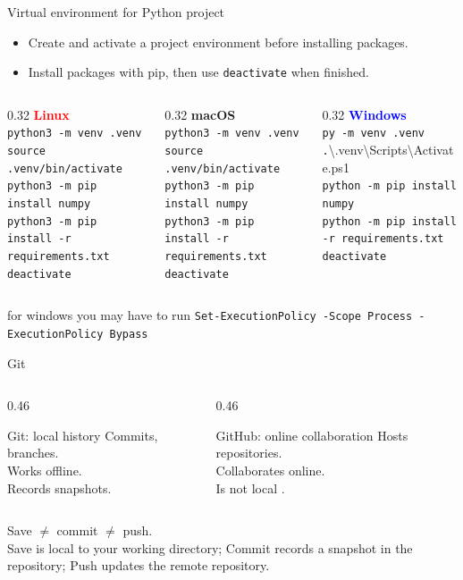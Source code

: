 \documentclass[aspectratio=169,11pt]{beamer}
\newcommand{\commandbar}[3]{%
  \vfill
  \begin{columns}[T,onlytextwidth]
    \begin{column}{0.32\textwidth}
      \centering
      \textcolor{red}{\textbf{Linux}}\\
      \scriptsize #1
    \end{column}
    \begin{column}{0.32\textwidth}
      \centering
      \textcolor{green!50!black}{\textbf{macOS}}\\
      \scriptsize #2
    \end{column}
    \begin{column}{0.32\textwidth}
      \centering
      \textcolor{blue}{\textbf{Windows}}\\
      \scriptsize #3
    \end{column}
  \end{columns}
}
\begin{document}
\begin{frame}[fragile]{Virtual environment for Python project}
  \begin{itemize}
    \item Create and activate a project environment before installing packages.
    \item Install packages with pip, then use \texttt{deactivate} when finished.
  \end{itemize}
  \commandbar{
    \texttt{python3 -m venv .venv}\\
    \texttt{source .venv/bin/activate}\\
    \texttt{python3 -m pip install numpy}\\
    \texttt{python3 -m pip install -r requirements.txt}\\
    \texttt{deactivate}
  }{
    \texttt{python3 -m venv .venv}\\
    \texttt{source .venv/bin/activate}\\
    \texttt{python3 -m pip install numpy}\\
    \texttt{python3 -m pip install -r requirements.txt}\\
    \texttt{deactivate}
  }{
    \texttt{py -m venv .venv}\\
    \texttt{.}\textbackslash{}.venv\textbackslash{}Scripts\textbackslash{}Activate.ps1\\
    \texttt{python -m pip install numpy}\\
    \texttt{python -m pip install -r requirements.txt}\\
    \texttt{deactivate}
  }
  for windows you may have to run \texttt{Set-ExecutionPolicy -Scope Process -ExecutionPolicy Bypass}
\end{frame}





\begin{frame}{Git}
  \begin{columns}[T]
    \begin{column}{0.46\textwidth}
      \begin{block}{Git: local history}
        Commits, branches.\\
        Works offline.\\
        Records snapshots.
      \end{block}
    \end{column}
    \begin{column}{0.46\textwidth}
      \begin{block}{GitHub: online collaboration}
        Hosts repositories.\\
        Collaborates online.\\
        Is not local .
      \end{block}
    \end{column}
  \end{columns}
  \vspace{5mm}
  Save $\ne$ commit $\ne$ push.\\
  Save is local to your working directory; Commit records a snapshot in the repository; Push updates the remote repository.
\end{frame}
\end{document}
